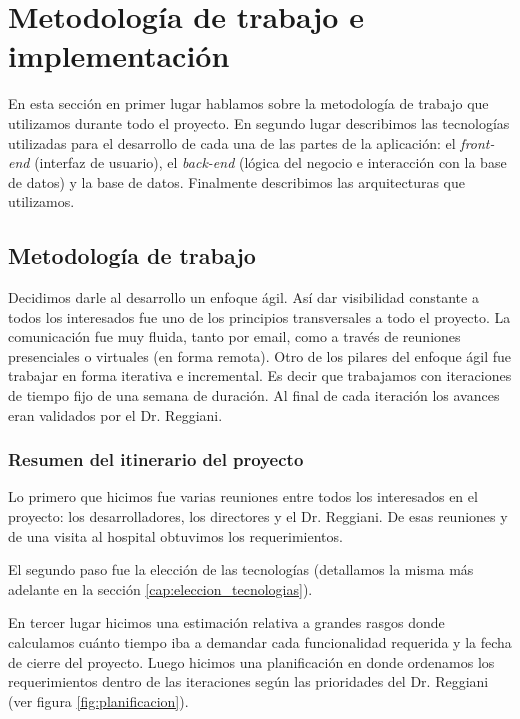 \section{Metodología de trabajo e implementación}
En esta sección en primer lugar hablamos sobre la metodología de trabajo que utilizamos durante todo el proyecto. En segundo lugar describimos las tecnologías utilizadas para el desarrollo de cada una de las partes de la aplicación: el \textit{front-end} (interfaz de usuario), el \textit{back-end} (lógica del negocio e interacción con la base de datos) y la base de datos. Finalmente describimos las arquitecturas que utilizamos.

\subsection{Metodología de trabajo}
Decidimos darle al desarrollo un enfoque ágil\cite{Shore}. Así dar visibilidad constante a todos los interesados fue uno de los principios transversales a todo el proyecto. La comunicación fue muy fluida, tanto por email, como a través de reuniones presenciales o virtuales (en forma remota). Otro de los pilares del enfoque ágil fue trabajar en forma iterativa e incremental. Es decir que trabajamos con iteraciones de tiempo fijo de una semana de duración. Al final de cada iteración los avances eran validados por el Dr. Reggiani.

\subsubsection{Resumen del itinerario del proyecto}\label{cap:itinerario}
Lo primero que hicimos fue varias reuniones entre todos los interesados en el proyecto: los desarrolladores, los directores y el Dr. Reggiani. De esas reuniones y de una visita al hospital obtuvimos los requerimientos.

El segundo paso fue la elección de las tecnologías (detallamos la misma más adelante en la sección \ref{cap:eleccion_tecnologias}).

En tercer lugar hicimos una estimación relativa a grandes rasgos donde calculamos cuánto tiempo iba a demandar cada funcionalidad requerida y la fecha de cierre del proyecto. Luego hicimos una planificación en donde ordenamos los requerimientos dentro de las iteraciones según las prioridades del Dr. Reggiani (ver figura \ref{fig:planificacion}).

